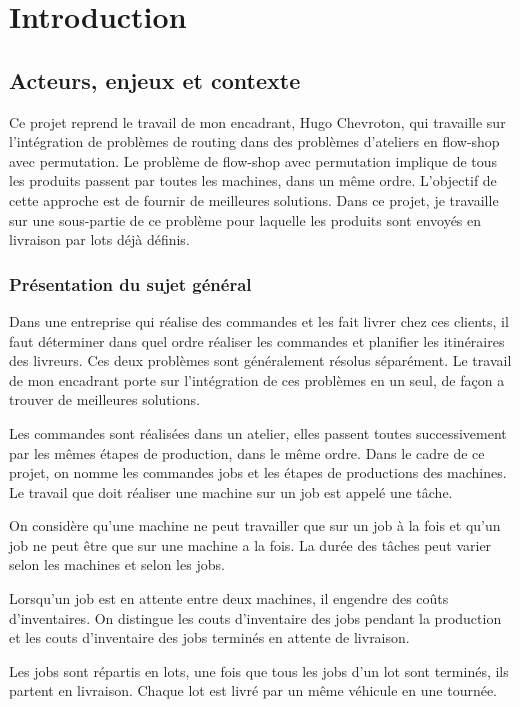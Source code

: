 \chapter{Introduction}

\section{Acteurs, enjeux et contexte}
Ce projet reprend le travail de mon encadrant, Hugo Chevroton, 
    qui travaille sur l'intégration de problèmes de routing dans des problèmes d'ateliers en flow-shop avec permutation.
Le problème de flow-shop avec permutation implique de tous les produits passent par toutes les machines, dans un même ordre.
  L'objectif de cette approche est de fournir de meilleures solutions.
Dans ce projet, je travaille sur une sous-partie de ce problème pour laquelle les produits sont envoyés en livraison par lots déjà définis.

\subsection{Présentation du sujet général}
Dans une entreprise qui réalise des commandes et les fait livrer chez ces clients,
    il faut déterminer dans quel ordre réaliser les commandes et planifier les itinéraires des livreurs.
Ces deux problèmes sont généralement résolus séparément.
Le travail de mon encadrant porte sur l'intégration de ces problèmes en un seul,
     de façon a trouver de meilleures solutions.

Les commandes sont réalisées dans un atelier, 
    elles passent toutes successivement par les mêmes étapes de production, dans le même ordre.
Dans le cadre de ce projet, on nomme les commandes jobs et les étapes de productions des machines.
Le travail que doit réaliser une machine sur un job est appelé une tâche.

On considère qu'une machine ne peut travailler que sur un job à la fois 
    et qu'un job ne peut être que sur une machine a la fois.
La durée des tâches peut varier selon les machines et selon les jobs.

Lorsqu'un job est en attente entre deux machines, il engendre des coûts d'inventaires.
On distingue les couts d'inventaire des jobs pendant la production 
    et les couts d'inventaire des jobs terminés en attente de livraison.

Les jobs sont répartis en lots, une fois que tous les jobs d'un lot sont terminés, ils partent en livraison.
Chaque lot est livré par un même véhicule en une tournée.

